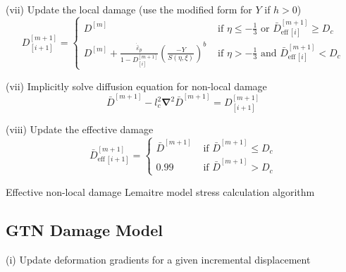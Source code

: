 \documentclass[sn-mathphys,Numbered]{sn-jnl}%
\newcommand{\bb}{\boldsymbol}
\begin{document}
\begin{appendices}
\begin{algorithm}[htbp]
(vii) Update the local damage (use the modified form for $Y$ if $h > 0$)
\begin{equation} %
	D^{[m+1]}_{[i+1]}  =
	\begin{cases}
		D^{[m]} &
		\text { if } \eta \leq -\frac{1}{3} \text{ or } \bar{D}^{[m+1]}_{\text{eff}\,[i]} \geq D_c \\
		D^{[m]} + \frac{\dot{\bar{\varepsilon}}_p}{1 - D^{[m+1]}_{[i]}}\left(\frac{-Y}{S(\eta,\xi)}\right)^b
		& 
		\text { if } \eta>-\frac{1}{3} \text{ and }  \bar{D}^{[m+1]}_{\text{eff}\,[i]} < D_c
	\end{cases}  \nonumber
\end{equation}

(vii) Implicitly solve diffusion equation for non-local damage
\begin{equation}
	\bar{D}^{[m+1]} -  l_c^2 \bb{\nabla}^2 \bar{D}^{[m+1]} = D^{[m+1]}_{[i+1]} \nonumber
\end{equation}
  
(viii) Update the effective damage
\begin{equation}
	\bar{D}^{[m+1]}_{\text{eff}\,[i+1]}  =
	\begin{cases}
		\bar{D}^{[m+1]} &
		\text { if }  \bar{D}^{[m+1]} \leq D_c \\
		0.99	& 
		\text { if }  \bar{D}^{[m+1]} > D_c
	\end{cases}  \nonumber
\end{equation}

\caption{Effective non-local damage Lemaitre model stress calculation algorithm}
\end{algorithm}
\normalsize







\subsection{GTN Damage Model}



\begin{algorithm}[htbp] \label{alg:GTN} \footnotesize
\SetAlgoLined
(i) Update deformation gradients for a given incremental displacement


\end{algorithm}
\end{appendices}
\end{document}
